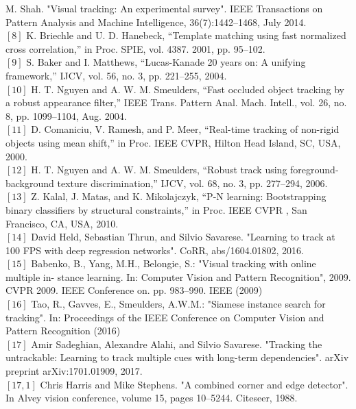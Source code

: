 \documentclass{bmvc2k}
\begin{document}
M. Shah. "Visual tracking: An experimental survey". IEEE Transactions on Pattern
Analysis and Machine Intelligence, 36(7):1442–1468, July 2014.\\
$\left[8\right]$  K. Briechle and U. D. Hanebeck, “Template matching using fast
normalized  cross  correlation,”  in Proc.  SPIE,  vol.  4387.  2001, pp. 95–102.\\
$\left[9\right]$  S. Baker and I. Matthews, “Lucas-Kanade 20 years on: A unifying framework,” IJCV, vol. 56, no. 3, pp. 221–255, 2004.\\
$\left[10\right]$  H.  T.  Nguyen  and  A.  W.  M.  Smeulders,  “Fast  occluded  object tracking by a robust appearance filter,”
IEEE Trans. Pattern Anal. Mach. Intell., vol. 26, no. 8, pp. 1099–1104, Aug. 2004.\\
$\left[11\right]$  D.  Comaniciu,  V.  Ramesh,  and  P.  Meer,  “Real-time  tracking  of non-rigid objects using mean shift,” in
Proc. IEEE CVPR, Hilton Head Island, SC, USA, 2000.\\
$\left[12\right]$  H.  T.  Nguyen  and  A.  W.  M.  Smeulders,  “Robust  track  using foreground-background  texture discrimination,” IJCV,  vol.  68, no. 3, pp. 277–294, 2006.\\
$\left[13\right]$  Z.    Kalal,    J.    Matas,    and    K.    Mikolajczyk,    “P-N    learning:
Bootstrapping  binary  classifiers  by  structural  constraints,”  in
Proc. IEEE CVPR
, San Francisco, CA, USA, 2010.\\
$\left[14\right]$  David Held, Sebastian Thrun, and Silvio Savarese. "Learning to track at 100 FPS
with deep regression networks". CoRR, abs/1604.01802, 2016.\\
$\left[15\right]$  Babenko,  B.,  Yang,  M.H.,  Belongie,  S.:  "Visual  tracking  with  online  multiple  in-
stance learning. In: Computer Vision and Pattern Recognition", 2009. CVPR 2009.
IEEE Conference on. pp. 983–990. IEEE (2009)\\
$\left[16\right]$  Tao, R., Gavves, E., Smeulders, A.W.M.: "Siamese instance search for tracking". In:
Proceedings of the IEEE Conference on Computer Vision and Pattern Recognition
(2016)\\
$\left[17\right]$  Amir Sadeghian, Alexandre Alahi, and Silvio Savarese. "Tracking the untrackable:
Learning to track multiple cues with long-term dependencies".
arXiv preprint
arXiv:1701.01909, 2017.\\
$\left[17,1\right]$  Chris Harris and Mike Stephens. "A combined corner and edge detector". In Alvey
vision conference, volume 15, pages 10–5244. Citeseer, 1988.\\
\end{document}
